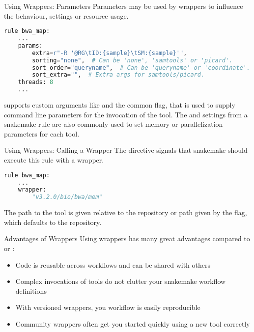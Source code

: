 \begin{frame}[fragile]{Using Wrappers: Parameters}
    Parameters may be used by wrappers to influence the behaviour, settings or resource usage.
    \begin{lstlisting}[language=Python,style=Python]
rule bwa_map:
    ...
    params:
        extra=r"-R '@RG\tID:{sample}\tSM:{sample}'",
        sorting="none",  # Can be 'none', 'samtools' or 'picard'.
        sort_order="queryname",  # Can be 'queryname' or 'coordinate'.
        sort_extra="",  # Extra args for samtools/picard.
    threads: 8
    ...
    \end{lstlisting}
    \begin{docs}
         supports custom arguments like  and
        the common  flag, that is used to supply command line parameters
        for the invocation of the tool. The  and 
        settings from a snakemake rule are also commonly used to set memory or parallelization
        parameters for each tool.
    \end{docs}
\end{frame}

\begin{frame}[fragile]{Using Wrappers: Calling a Wrapper}
    The  directive signals that snakemake should execute this rule with
    a wrapper.
    \begin{lstlisting}[language=Python,style=Python]
rule bwa_map:
    ...
    wrapper:
        "v3.2.0/bio/bwa/mem"
    \end{lstlisting}
    \begin{docs}
        The path to the tool is given relative to the repository or path given by the 
        flag, which defaults to the  repository.
    \end{docs}
\end{frame}

\begin{frame}{Advantages of Wrappers}
    Using wrappers has many great advantages compared to  or :
    \begin{itemize}[<+->]
        \item Code is reusable across workflows and can be shared with others
        \item Complex invocations of tools do not clutter your snakemake workflow definitions
        \item With versioned wrappers, you workflow is easily reproducible
        \item Community wrappers often get you started quickly using a new tool correctly
    \end{itemize}
\end{frame}
